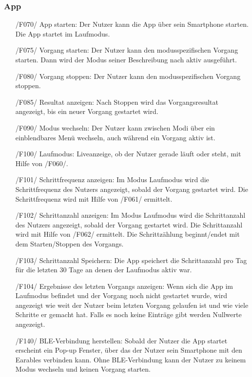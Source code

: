 \documentclass[a4paper,12pt]{article}
\begin{document}
    \subsubsection{App}
      \begin{itemize}
      \item[/F070/] \textsf{App starten:} Der Nutzer kann die App über sein Smartphone starten. Die App startet im Laufmodus.
      \item[/F075/] \textsf{Vorgang starten:} Der Nutzer kann den modusspezifischen \Gls{Vorgang} starten. Dann wird der Modus seiner Beschreibung nach aktiv ausgeführt.
      \item[/F080/] \textsf{Vorgang stoppen:} Der Nutzer kann den modusspezifischen \Gls{Vorgang} stoppen.
      \item[/F085/] \textsf{Resultat anzeigen:} Nach Stoppen wird das Vorgangsresultat angezeigt, bis ein neuer \Gls{Vorgang} gestartet wird.
      \item[/F090/] \textsf{Modus wechseln:} Der Nutzer kann zwischen Modi über ein einblendbares Menü wechseln, auch während ein Vorgang aktiv ist.
      \item[/F100/] \textsf{Laufmodus:} Liveanzeige, ob der Nutzer gerade \glqq läuft\grqq{} oder \glqq steht\grqq{}, mit Hilfe von /F060/.
      \item[/F101/] \textsf {Schrittfrequenz anzeigen:} Im Modus \glqq{}Laufmodus\grqq{} wird die Schrittfrequenz des Nutzers angezeigt, sobald der Vorgang gestartet wird. Die Schrittfrequenz wird mit Hilfe von /F061/ ermittelt.
      \item[/F102/] \textsf {Schrittanzahl anzeigen:} Im Modus \glqq{}Laufmodus\grqq{} wird die Schrittanzahl des Nutzers angezeigt, sobald der Vorgang gestartet wird. Die Schrittanzahl wird mit Hilfe von /F062/ ermittelt. Die Schrittzählung beginnt/endet mit dem Starten/Stoppen des Vorgangs.
      \item[/F103/] \textsf{Schrittanzahl Speichern:} Die App speichert die Schrittanzahl pro Tag für die letzten 30 Tage an denen der Laufmodus aktiv war.
      \item[/F104/] \textsf{Ergebnisse des letzten Vorgangs anzeigen:} Wenn sich die App im Laufmodus befindet und der Vorgang noch nicht gestartet wurde, wird angezeigt wie weit der Nutzer beim letzten Vorgang gelaufen ist und wie viele Schritte er gemacht hat. Falls es noch keine Einträge gibt werden Nullwerte angezeigt.
      \item[/F140/] \textsf{BLE-Verbindung herstellen:} Sobald der Nutzer die App startet erscheint ein Pop-up Fenster, über das der Nutzer sein Smartphone mit den \gls{Earables} verbinden kann. Ohne BLE-Verbindung kann der Nutzer zu keinem Modus wechseln und keinen Vorgang starten.

\end{itemize}
\end{document}
